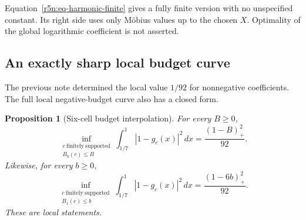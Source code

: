\documentclass[11pt,a4paper]{article}
\newtheorem{proposition}[theorem]{Proposition}
\theoremstyle{definition}\newtheorem{definition}[theorem]{Definition}
\theoremstyle{remark}\newtheorem{remark}[theorem]{Remark}
\numberwithin{equation}{section}
\begin{document}
Equation~\eqref{r5n:eq-harmonic-finite} gives a fully finite
version with no unspecified constant. Its right side uses only
M\"obius values up to the chosen \(X\).
Optimality of the global logarithmic coefficient is not asserted.

\subsection{An exactly sharp local budget curve}
\label{r5n:subsec-local}

The previous note \cite{TransferZeta} determined the local value
\(1/92\) for nonnegative coefficients. The full local
negative-budget curve also has a closed form.

\begin{proposition}[Six-cell budget interpolation]
\label{r5n:prop-local-budget}
For every \(B\ge0\),
\begin{equation}
\label{r5n:eq-local-b0}
 \inf_{\substack{c\ \mathrm{finitely\ supported}\\B_0(c)\le B}}
 \int_{1/7}^1|1-g_c(x)|^2\,dx
 =\frac{(1-B)_+^2}{92}.
\end{equation}
Likewise, for every \(b\ge0\),
\begin{equation}
\label{r5n:eq-local-b1}
 \inf_{\substack{c\ \mathrm{finitely\ supported}\\B_1(c)\le b}}
 \int_{1/7}^1|1-g_c(x)|^2\,dx
 =\frac{(1-6b)_+^2}{92}.
\end{equation}
These are local statements.
\end{proposition}
\end{document}
